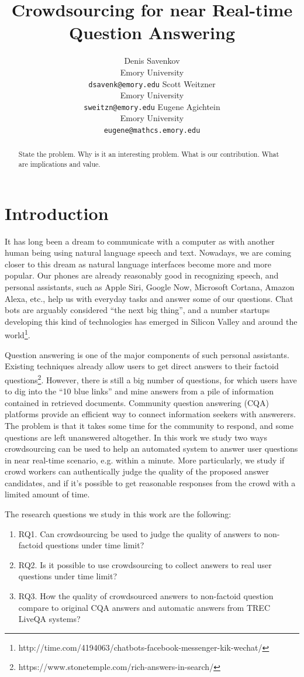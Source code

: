 \documentclass[11pt,letterpaper]{article}
\title{Crowdsourcing for near Real-time Question Answering}
\author{Denis Savenkov \\ Emory University \\ {\tt dsavenk@emory.edu} 
  \And Scott Weitzner \\ Emory University \\ {\tt sweitzn@emory.edu}
  \And Eugene Agichtein \\ Emory University \\ {\tt eugene@mathcs.emory.edu}
}
\date{}
\begin{document}
\maketitle

\begin{abstract}
State the problem.
Why is it an interesting problem.
What is our contribution.
What are implications and value.
\end{abstract}

\section{Introduction}
\label{sec:introduction}

It has long been a dream to communicate with a computer as with another human being using natural language speech and text.
Nowadays, we are coming closer to this dream as natural language interfaces become more and more popular.
Our phones are already reasonably good in recognizing speech, and personal assistants, such as Apple Siri, Google Now, Microsoft Cortana, Amazon Alexa, etc., help us with everyday tasks and answer some of our questions.
Chat bots are arguably considered ``the next big thing'', and a number startups developing this kind of technologies has emerged in Silicon Valley and around the world\footnote{http://time.com/4194063/chatbots-facebook-messenger-kik-wechat/}.

Question answering is one of the major components of such personal assistants.
Existing techniques already allow users to get direct answers to their factoid questions\footnote{https://www.stonetemple.com/rich-answers-in-search/}.
However, there is still a big number of questions, for which users have to dig into the ``10 blue links'' and mine answers from a pile of information contained in retrieved documents.
Community question answering (CQA) platforms provide an efficient way to connect information seekers with answerers.
The problem is that it takes some time for the community to respond, and some questions are left unanswered altogether.
In this work we study two ways crowdsourcing can be used to help an automated system to answer user questions in near real-time scenario, e.g. within a minute.
More particularly, we study if crowd workers can authentically judge the quality of the proposed answer candidates, and if it's possible to get reasonable responses from the crowd with a limited amount of time.

The research questions we study in this work are the following:
\begin{enumerate}
\item RQ1. Can crowdsourcing be used to judge the quality of answers to non-factoid questions under time limit?
\item RQ2. Is it possible to use crowdsourcing to collect answers to real user questions under time limit?
\item RQ3. How the quality of crowdsourced answers to non-factoid question compare to original CQA answers and automatic answers from TREC LiveQA systems?
\end{enumerate}
\end{document}
